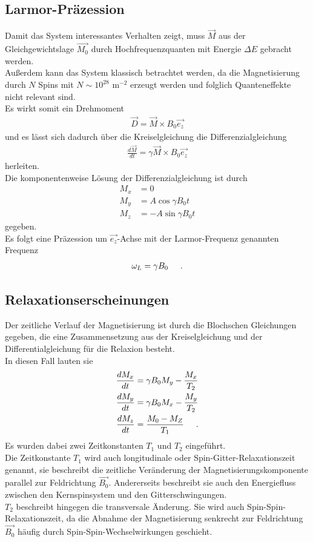 \documentclass[]{scrartcl}
\begin{document}
\subsection{Larmor-Präzession}
Damit das System interessantes Verhalten zeigt, muss $\vec{M}$ aus der Gleichgewichtslage $\vec{M_0}$ durch Hochfrequenzquanten mit Energie $\Delta E$ gebracht werden.\\
Außerdem kann das System klassisch betrachtet werden, da die Magnetisierung durch $N$ Spins mit $N \sim 10^{28}$ m$^{-2}$ erzeugt werden und folglich Quanteneffekte nicht relevant sind.\\
Es wirkt somit ein Drehmoment
\begin{align}
\vec{D}=\vec{M}\times B_0 \vec{e_z}
\end{align}
und es lässt sich dadurch über die Kreiselgleichung die Differenzialgleichung
\begin{align}
\frac{d \vec{M}}{d t} = \gamma \vec{M}\times B_0 \vec{e_z}\label{eq::magzeit}
\end{align}
herleiten.\\
Die komponentenweise Lösung der Differenzialgleichung ist durch
\begin{align}
M_x&= 0 \\
M_y&= A \cos \gamma B_0 t \\
M_z&= -A \sin \gamma B_0 t
\end{align}
gegeben.\\
Es folgt eine Präzession um $\vec{e_z}$-Achse mit der Larmor-Frequenz genannten Frequenz
\begin{align}
\omega_L =\gamma B_0 \hspace*{0.5cm}\text{.}
\end{align}
\subsection{Relaxationserscheinungen}
Der zeitliche Verlauf der Magnetisierung ist durch die Blochschen Gleichungen gegeben, die eine Zusammensetzung aus der Kreiselgleichung und der Differentialgleichung für die Relaxion besteht.\\
In diesen Fall lauten sie
\begin{align}
\frac{d M_x}{d t}&= \gamma B_0 M_y - \frac{M_x}{T_2}\\
\frac{d M_y}{d t}&= \gamma B_0 M_x - \frac{M_y}{T_2}\\
\frac{d M_z}{d t}&= \frac{M_0-M_Z}{T_1}\hspace*{0.5cm}\text{.}
\end{align}
Es wurden dabei zwei Zeitkonstanten $T_1$ und $T_2$ eingeführt.\\
Die Zeitkonstante $T_1$ wird auch longitudinale oder Spin-Gitter-Relaxationszeit genannt, sie beschreibt die zeitliche Veränderung der Magnetisierungskomponente parallel zur Feldrichtung $\vec{B_0}$. Andererseits beschreibt sie auch den Energiefluss zwischen den Kernspinsystem und den Gitterschwingungen.\\
$T_2$ beschreibt hingegen die transversale Änderung. Sie wird auch Spin-Spin-Relaxationszeit, da die Abnahme der Magnetisierung senkrecht zur Feldrichtung $\vec{B_0}$ häufig durch Spin-Spin-Wechselwirkungen geschieht.
\end{document}
